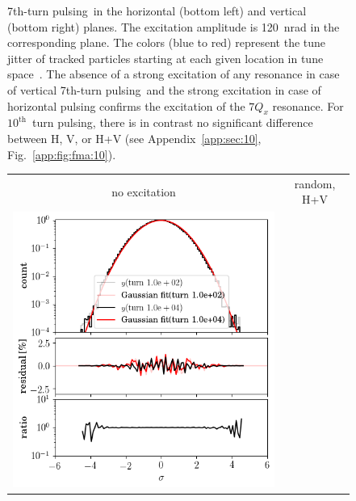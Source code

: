 \documentclass[%
 reprint,
 amsmath,amssymb,
 aps,
prstab,
longbibliography
]{revtex4-1}
\newcommand{\seventhtp}{7th-turn pulsing}
\newlength{\halfwidth}
\begin{document}
\begin{figure}
{    \seventhtp\ in the horizontal (bottom left) and
    vertical (bottom right) planes. The excitation amplitude is
    120~nrad in the corresponding plane. The colors (blue to red)
    represent the tune jitter of tracked particles starting at each
    given location in tune space~\cite{fmalaskar}. The absence of a
    strong excitation of any resonance in case of vertical
    \seventhtp\ and the strong excitation in case
    of horizontal pulsing confirms the excitation of the $7 Q_x$
    resonance. For $10^{\mathrm{th}}$~turn pulsing, there is in
    contrast no significant difference between H, V, or H+V (see
    Appendix~\ref{app:sec:10}, Fig.~\ref{app:fig:fma:10}).}
  \label{fig:patternfma}
\end{figure}

\begin{figure}
  \begin{tabular}{cc}
    no excitation & random, H+V \\
    \includegraphics[width=\halfwidth]{2016injerra2b2u_3_5um_hist_y.png} &

\end{tabular}
\end{figure}
\end{document}
